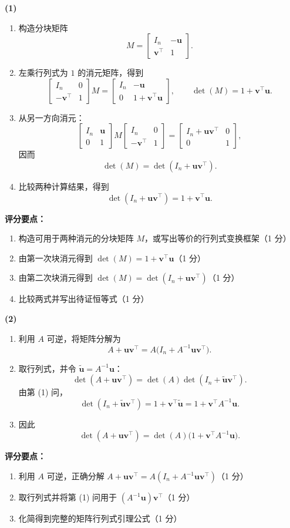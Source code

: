 \documentclass[10pt,a4paper]{exam-zh}
\newcommand{\bvec}[1]{\boldsymbol{#1}}
\newenvironment{grading}
  {\par\smallskip\Needspace{5\baselineskip}\small
   \noindent\textcolor{gradingred}{\textbf{评分要点：}}
   \begin{enumerate}[label=\textcolor{gradingred}{\arabic*.},
     leftmargin=2.4em,itemsep=0pt,topsep=2pt,parsep=0pt]}
  {\end{enumerate}\smallskip}
\newcommand{\gradeitem}[2]{\item #1（\textcolor{gradingred}{#2 分}）}
\newenvironment{answersteps}
  {\begin{enumerate}[label=\textbf{步骤 \arabic*.},
    leftmargin=4.8em,labelsep=0.6em,itemsep=2pt,topsep=3pt,parsep=0pt]}
  {\end{enumerate}}
\newcommand{\subanswer}[1]{%
  \par\medskip\Needspace{6\baselineskip}\noindent\textbf{#1}\par}
\begin{document}
\begin{solution}
\subanswer{(1)}
\begin{answersteps}
  \item 构造分块矩阵
  \[
  M=
  \begin{bmatrix}
  I_n&-\bvec u\\
  \bvec v^\top&1
  \end{bmatrix}.
  \]
  \item 左乘行列式为 $1$ 的消元矩阵，得到
  \[
  \begin{bmatrix}I_n&0\\-\bvec v^\top&1\end{bmatrix}M
  =
  \begin{bmatrix}
  I_n&-\bvec u\\
  0&1+\bvec v^\top\bvec u
  \end{bmatrix},
  \qquad
  \det(M)=1+\bvec v^\top\bvec u.
  \]
  \item 从另一方向消元：
  \[
  \begin{bmatrix}I_n&\bvec u\\0&1\end{bmatrix}
  M
  \begin{bmatrix}I_n&0\\-\bvec v^\top&1\end{bmatrix}
  =
  \begin{bmatrix}
  I_n+\bvec u\bvec v^\top&0\\
  0&1
  \end{bmatrix},
  \]
  因而
  \[
  \det(M)=\det(I_n+\bvec u\bvec v^\top).
  \]
  \item 比较两种计算结果，得到
  \[
  \boxed{\det(I_n+\bvec u\bvec v^\top)=1+\bvec v^\top\bvec u}.
  \]
\end{answersteps}
\begin{grading}
  \gradeitem{构造可用于两种消元的分块矩阵 $M$，或写出等价的行列式变换框架}{1}
  \gradeitem{由第一次块消元得到 $\det(M)=1+\bvec v^\top\bvec u$}{1}
  \gradeitem{由第二次块消元得到 $\det(M)=\det(I_n+\bvec u\bvec v^\top)$}{1}
  \gradeitem{比较两式并写出待证恒等式}{1}
\end{grading}

\subanswer{(2)}
\begin{answersteps}
  \item 利用 $A$ 可逆，将矩阵分解为
  \[
  A+\bvec u\bvec v^\top
  =A\bigl(I_n+A^{-1}\bvec u\bvec v^\top\bigr).
  \]
  \item 取行列式，并令 $\widetilde{\bvec u}=A^{-1}\bvec u$：
  \[
  \det(A+\bvec u\bvec v^\top)
  =\det(A)\det(I_n+\widetilde{\bvec u}\bvec v^\top).
  \]
  由第 (1) 问，
  \[
  \det(I_n+\widetilde{\bvec u}\bvec v^\top)
  =1+\bvec v^\top\widetilde{\bvec u}
  =1+\bvec v^\top A^{-1}\bvec u.
  \]
  \item 因此
  \[
  \boxed{\det(A+\bvec u\bvec v^\top)
  =\det(A)\bigl(1+\bvec v^\top A^{-1}\bvec u\bigr)}.
  \]
\end{answersteps}
\begin{grading}
  \gradeitem{利用 $A$ 可逆，正确分解
  $A+\bvec u\bvec v^\top=A(I_n+A^{-1}\bvec u\bvec v^\top)$}{1}
  \gradeitem{取行列式并将第 (1) 问用于 $(A^{-1}\bvec u)\bvec v^\top$}{1}
  \gradeitem{化简得到完整的矩阵行列式引理公式}{1}
\end{grading}


\end{solution}
\end{document}
